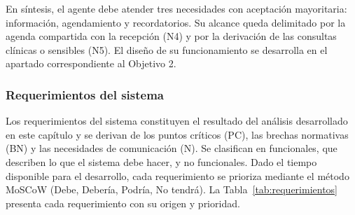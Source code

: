 En síntesis, el agente debe atender tres necesidades con aceptación mayoritaria: información, agendamiento y recordatorios. Su alcance queda delimitado por la agenda compartida con la recepción (N4) y por la derivación de las consultas clínicas o sensibles (N5). El diseño de su funcionamiento se desarrolla en el apartado correspondiente al Objetivo 2.

\subsubsection{Requerimientos del sistema}

Los requerimientos del sistema constituyen el resultado del análisis desarrollado en este capítulo y se derivan de los puntos críticos (PC), las brechas normativas (BN) y las necesidades de comunicación (N). Se clasifican en funcionales, que describen lo que el sistema debe hacer, y no funcionales. Dado el tiempo disponible para el desarrollo, cada requerimiento se prioriza mediante el método MoSCoW (Debe, Debería, Podría, No tendrá). La Tabla~\ref{tab:requerimientos} presenta cada requerimiento con su origen y prioridad.

